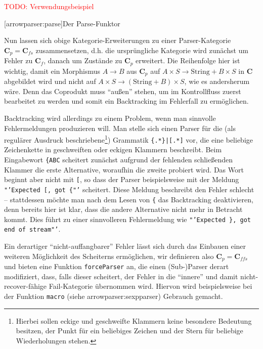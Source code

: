 \documentclass[12pt, a4paper, bibgerm]{scrbook}
\newcommand\icode[1]{\lstinline?#1?}
\newcommand{\todo}[1]{
  \textcolor{red}{TODO: #1}
}
\newcommand\lsection{}
\newcommand\sref{}
\newcommand\ato{\rightarrow} %
\newcommand{\sees}[1]{(siehe \sref{#1})}
\begin{document}
\todo{Verwendungsbeispiel}

\lsection[arrowparser:parse]{Der Parse-Funktor}

Nun lassen sich obige Kategorie-Erweiterungen zu einer Parser-Kategorie
$\mathbf{C}_p = \mathbf{C}_{fs}$ zusammensetzen, d.h. die ursprüngliche
Kategorie wird zunächst um Fehler zu $\mathbf{C}_f$, danach um Zustände
zu $\mathbf{C}_p$ erweitert. Die Reihenfolge hier ist wichtig, damit ein
Morphismus $A \ato B$ aus $\mathbf{C}_p$ auf $A \times S \ato
\mathrm{String} + B \times S$ in $\mathbf{C}$ abgebildet wird und nicht
auf $A \times S \ato (\mathrm{String} + B) \times S$, wie es andersherum
wäre. Denn das Coprodukt muss "`außen"' stehen, um im Kontrollfluss
zuerst bearbeitet zu werden und somit ein Backtracking im Fehlerfall zu
ermöglichen.

Backtracking wird allerdings zu einem Problem, wenn man sinnvolle
Fehlermeldungen produzieren will. Man stelle sich einen Parser für die
(als regulärer Ausdruck beschriebene\footnote{Hierbei sollen eckige und
  geschweifte Klammern keine besondere Bedeutung besitzen, der Punkt für
  ein beliebiges Zeichen und der Stern für beliebige Wiederholungen
  stehen.}) Grammatik \texttt{\{.*\}|[.*]} vor, die eine beliebige
Zeichenkette in geschweiften oder eckigen Klammern beschreibt. Beim
Eingabewort \texttt{\{ABC} scheitert zunächst aufgrund der fehlenden
schließenden Klammer die erste Alternative, woraufhin die zweite
probiert wird. Das Wort beginnt aber nicht mit \texttt{[}, so dass der
  Parser beispielsweise mit der Meldung \texttt{"'Expected [, got \{"'}
    scheitert. Diese Meldung beschreibt den Fehler schlecht --
    stattdessen möchte man nach dem Lesen von \texttt{\{} das
    Backtracking deaktivieren, denn bereits hier ist klar, dass die
    andere Alternative nicht mehr in Betracht kommt. Dies führt zu einer
    sinnvolleren Fehlermeldung wie \texttt{"'Expected \}, got end of
      stream"'}.

Ein derartiger "`nicht-auffangbarer"' Fehler lässt sich durch das
Einbauen einer weiteren Möglichkeit des Scheiterns ermöglichen, wir
definieren also $\mathbf{C}_p = \mathbf{C}_{ffs}$ und bieten eine
Funktion \icode{forceParser} an, die einen (Sub-)Parser derart
modifiziert, dass, falls dieser scheitert, der Fehler in die "`innere"'
und damit nicht-recover-fähige Fail-Kategorie übernommen wird. Hiervon
wird beispielsweise bei der Funktion \icode{macro}
\sees{arrowparser:sexpparser} Gebrauch gemacht.
\end{document}

